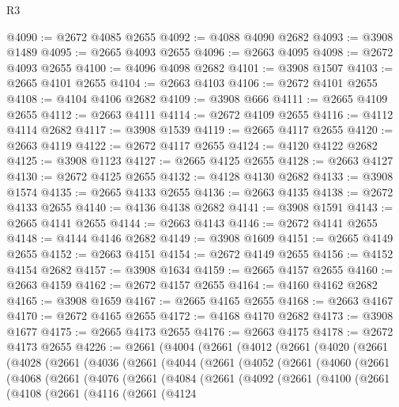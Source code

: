 \begin{lexlean}{R3}
\begin{coremodule}
@4090 := @2672 @4085 @2655
@4092 := @4088 @4090 @2682
@4093 := @3908 @1489
@4095 := @2665 @4093 @2655
@4096 := @2663 @4095
@4098 := @2672 @4093 @2655
@4100 := @4096 @4098 @2682
@4101 := @3908 @1507
@4103 := @2665 @4101 @2655
@4104 := @2663 @4103
@4106 := @2672 @4101 @2655
@4108 := @4104 @4106 @2682
@4109 := @3908 @666
@4111 := @2665 @4109 @2655
@4112 := @2663 @4111
@4114 := @2672 @4109 @2655
@4116 := @4112 @4114 @2682
@4117 := @3908 @1539
@4119 := @2665 @4117 @2655
@4120 := @2663 @4119
@4122 := @2672 @4117 @2655
@4124 := @4120 @4122 @2682
@4125 := @3908 @1123
@4127 := @2665 @4125 @2655
@4128 := @2663 @4127
@4130 := @2672 @4125 @2655
@4132 := @4128 @4130 @2682
@4133 := @3908 @1574
@4135 := @2665 @4133 @2655
@4136 := @2663 @4135
@4138 := @2672 @4133 @2655
@4140 := @4136 @4138 @2682
@4141 := @3908 @1591
@4143 := @2665 @4141 @2655
@4144 := @2663 @4143
@4146 := @2672 @4141 @2655
@4148 := @4144 @4146 @2682
@4149 := @3908 @1609
@4151 := @2665 @4149 @2655
@4152 := @2663 @4151
@4154 := @2672 @4149 @2655
@4156 := @4152 @4154 @2682
@4157 := @3908 @1634
@4159 := @2665 @4157 @2655
@4160 := @2663 @4159
@4162 := @2672 @4157 @2655
@4164 := @4160 @4162 @2682
@4165 := @3908 @1659
@4167 := @2665 @4165 @2655
@4168 := @2663 @4167
@4170 := @2672 @4165 @2655
@4172 := @4168 @4170 @2682
@4173 := @3908 @1677
@4175 := @2665 @4173 @2655
@4176 := @2663 @4175
@4178 := @2672 @4173 @2655
@4226 := @2661
    (@4004
      (@2661
        (@4012
          (@2661
            (@4020
              (@2661
                (@4028
                  (@2661
                    (@4036
                      (@2661
                        (@4044
                          (@2661
                            (@4052
                              (@2661
                                (@4060
                                  (@2661
                                    (@4068
                                      (@2661
                                        (@4076
                                          (@2661
                                            (@4084
                                              (@2661
                                                (@4092
                                                  (@2661
                                                    (@4100
                                                      (@2661
                                                        (@4108
                                                          (@2661
                                                            (@4116
                                                              (@2661
                                                                (@4124

\end{coremodule}
\end{lexlean}
